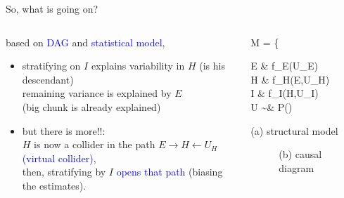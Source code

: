 \begin{frame}
	{So, what is going on?}
	\begin{columns}
		\begin{column}{0.5\textwidth}
			based on \textcolor{blue}{DAG} and \textcolor{blue}{statistical model},
			\begin{itemize}
				\item stratifying on $I$ explains variability in $H$ (is his descendant) \\
				remaining variance is explained by $E$ \\
				{\small (big chunk is already explained)}
				\item but there is more!!: \\
				$H$ is now a collider in the path $E \rightarrow H \leftarrow U_{H}$ \textcolor{blue}{(virtual collider)}, \\
				then, stratifying by $I$ \textcolor{blue}{opens that path} (biasing the estimates).
			\end{itemize}
		\end{column}
		\begin{column}{0.5\textwidth}  
			\begin{equ}
				M = \left\{ \begin{aligned} 
					E \leftarrow & \; f_{E}(U_{E}) \\
					H \leftarrow & \; f_{H}(E,U_{H}) \\
					I \leftarrow & \; f_{I}(H,U_{I}) \\
					U \sim & \; P()
				\end{aligned} \right
				\caption*{(a) structural model}
			\end{equ}
			\begin{figure}
				\caption*{(b) causal diagram}
			\end{figure}
		\end{column}
	\end{columns}
\end{frame}
